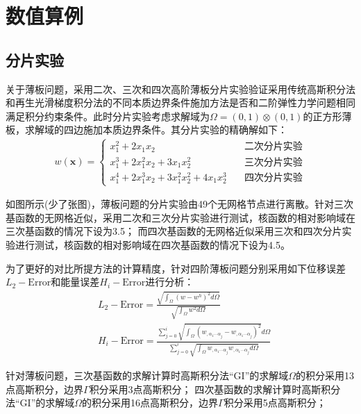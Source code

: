 \section{数值算例}
\subsection{分片实验}
关于薄板问题，采用二次、三次和四次高阶薄板分片实验验证采用传统高斯积分法和再生光滑梯度积分法的不同本质边界条件施加方法是否和二阶弹性力学问题相同
满足积分约束条件。此时分片实验考虑求解域为$\Omega=(0,1)\otimes(0,1)$的正方形薄板，求解域的四边施加本质边界条件。其分片实验的精确解如下：
\begin{equation}
\begin{split}
    w(\pmb{x})=\begin{cases}
        x_1^2+2x_1x_2\quad &\text{二次分片实验}\\
        x_1^3+2x_1^2x_2+3x_1x_2^2\quad &\text{三次分片实验}\\
        x_1^4+2x_1^3x_2+3x_1^2x_2^2+4x_1x_2^3\quad&\text{四次分片实验}
    \end{cases}
\end{split}
\end{equation}\par
如图所示(少了张图)，薄板问题的分片实验由49个无网格节点进行离散。针对三次基函数的无网格近似，采用二次和三次分片实验进行测试，核函数的相对影响域在三次基函数的情况下设为3.5；
而四次基函数的无网格近似采用三次和四次分片实验进行测试，核函数的相对影响域在四次基函数的情况下设为4.5。\par
为了更好的对比所提方法的计算精度，针对四阶薄板问题分别采用如下位移误差$L_2-\text{Error}$和能量误差$H_i-\text{Error}$进行分析：
\begin{equation}
\begin{split}
    &L_2-\text{Error}=\frac{\sqrt{\int_{\Omega}(w-w^h)^2d\Omega}}{\sqrt{\int_{\Omega}w^2d\Omega}}\\
    &H_i-\text{Error}=\frac{\sum_{j=0}^{i}\sqrt{\int_{\Omega}(w_{,\alpha_1\dotsb \alpha_j}-w_{,\alpha_1\dotsb \alpha_j})^2}d\Omega}{\sum_{j=0}^{i}\sqrt{\int_{\Omega}w_{,\alpha_1\dotsb \alpha_j}w_{,\alpha_1\dotsb \alpha_j}d\Omega}}
\end{split}
\end{equation}\par
针对薄板问题，三次基函数的求解计算时高斯积分法“GI”的求解域$\Omega$的积分采用13点高斯积分，边界$\Gamma$积分采用3点高斯积分；
四次基函数的求解计算时高斯积分法“GI”的求解域$\Omega$的积分采用16点高斯积分，边界$\Gamma$积分采用5点高斯积分；

